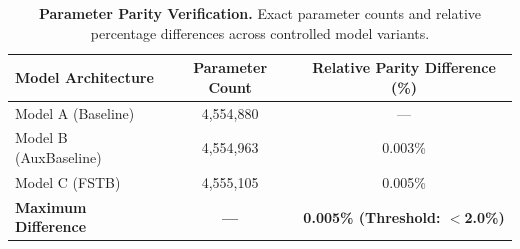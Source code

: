\begin{table}[htbp]
\centering
\caption{\textbf{Parameter Parity Verification.} Exact parameter counts and relative percentage differences across controlled model variants.}
\label{tab:parameter_parity}
\begin{tabular}{l c c}
\toprule
\textbf{Model Architecture} & \textbf{Parameter Count} & \textbf{Relative Parity Difference (\%)} \\
\midrule
Model A (Baseline) & 4,554,880 & --- \\
Model B (AuxBaseline) & 4,554,963 & 0.003\% \\
Model C (FSTB) & 4,555,105 & 0.005\% \\
\midrule
\textbf{Maximum Difference} & \textbf{---} & \textbf{0.005\% (Threshold: $<$2.0\%)} \\
\bottomrule
\end{tabular}
\end{table}

